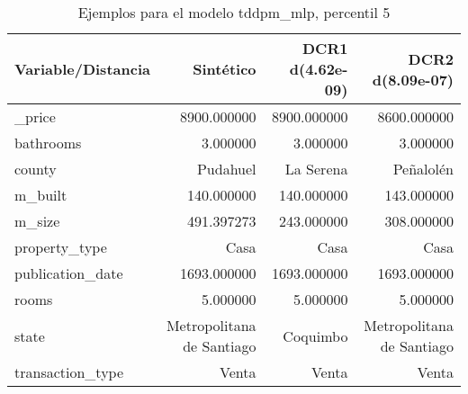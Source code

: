 \begin{table}[H]
\centering
\fontsize{10}{14}\selectfont
\caption{Ejemplos para el modelo tddpm\_mlp, percentil 5}
\label{table-example-economicos-a-1-tddpm_mlp-5p}
\begin{tabular}{|l|r|r|r|}
\hline
\rowcolor[gray]{0.8}
Variable/Distancia & Sintético & DCR1 d(4.62e-09) & DCR2 d(8.09e-07) \\
\hline \_price & \cellcolor[rgb]{0.9, 0.54, 0.52} 8900.000000 & \cellcolor[rgb]{0.9, 0.54, 0.52} 8900.000000 & 8600.000000 \\
\hline bathrooms & \cellcolor[rgb]{0.9, 0.54, 0.52} 3.000000 & \cellcolor[rgb]{0.9, 0.54, 0.52} 3.000000 & \cellcolor[rgb]{0.9, 0.54, 0.52} 3.000000 \\
\hline county & \cellcolor[rgb]{0.9, 0.54, 0.52} Pudahuel & La Serena & Peñalolén \\
\hline m\_built & \cellcolor[rgb]{0.9, 0.54, 0.52} 140.000000 & \cellcolor[rgb]{0.9, 0.54, 0.52} 140.000000 & 143.000000 \\
\hline m\_size & \cellcolor[rgb]{0.9, 0.54, 0.52} 491.397273 & 243.000000 & 308.000000 \\
\hline property\_type & \cellcolor[rgb]{0.9, 0.54, 0.52} Casa & \cellcolor[rgb]{0.9, 0.54, 0.52} Casa & \cellcolor[rgb]{0.9, 0.54, 0.52} Casa \\
\hline publication\_date & \cellcolor[rgb]{0.9, 0.54, 0.52} 1693.000000 & \cellcolor[rgb]{0.9, 0.54, 0.52} 1693.000000 & \cellcolor[rgb]{0.9, 0.54, 0.52} 1693.000000 \\
\hline rooms & \cellcolor[rgb]{0.9, 0.54, 0.52} 5.000000 & \cellcolor[rgb]{0.9, 0.54, 0.52} 5.000000 & \cellcolor[rgb]{0.9, 0.54, 0.52} 5.000000 \\
\hline state & \cellcolor[rgb]{0.9, 0.54, 0.52} Metropolitana de Santiago & Coquimbo & \cellcolor[rgb]{0.9, 0.54, 0.52} Metropolitana de Santiago \\
\hline transaction\_type & \cellcolor[rgb]{0.9, 0.54, 0.52} Venta & \cellcolor[rgb]{0.9, 0.54, 0.52} Venta & \cellcolor[rgb]{0.9, 0.54, 0.52} Venta \\
\hline
\end{tabular}
\end{table}
